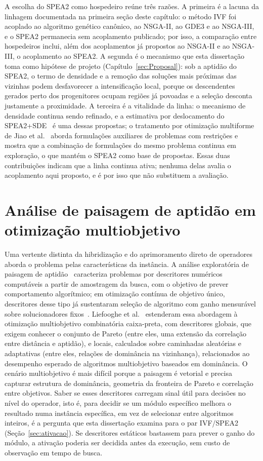 A escolha do SPEA2 como hospedeiro reúne três razões. A primeira é a lacuna da linhagem documentada na primeira seção deste capítulo: o método IVF foi acoplado ao algoritmo genético canônico, ao NSGA-II, ao GDE3 e ao NSGA-III, e o SPEA2 permanecia sem acoplamento publicado; por isso, a comparação entre hospedeiros inclui, além dos acoplamentos já propostos ao NSGA-II e ao NSGA-III, o acoplamento ao SPEA2. A segunda é o mecanismo que esta dissertação toma como hipótese de projeto (Capítulo~\ref{sec:Proposal}): sob a aptidão do SPEA2, o termo de densidade e a remoção das soluções mais próximas das vizinhas podem desfavorecer a intensificação local, porque os descendentes gerados perto dos progenitores ocupam regiões já povoadas e a seleção desconta justamente a proximidade. A terceira é a vitalidade da linha: o mecanismo de densidade continua sendo refinado, e a estimativa por deslocamento do SPEA2+SDE~\cite{li2014shift} é uma dessas propostas; o tratamento por otimização multiforme de Jiao et al.~\cite{jiao2023multiform} aborda formulações auxiliares de problemas com restrições e mostra que a combinação de formulações do mesmo problema continua em exploração, o que mantém o SPEA2 como base de propostas. Essas duas contribuições indicam que a linha continua ativa; nenhuma delas avalia o acoplamento aqui proposto, e é por isso que não substituem a avaliação.

\section{Análise de paisagem de aptidão em otimização multiobjetivo}
\label{sec:rw_paisagem}

Uma vertente distinta da hibridização e do aprimoramento direto de operadores aborda o problema pelas características da instância. A análise exploratória de paisagem de aptidão~\cite{mersmann2011exploratory} caracteriza problemas por descritores numéricos computáveis a partir de amostragem da busca, com o objetivo de prever comportamento algorítmico; em otimização contínua de objetivo único, descritores desse tipo já sustentaram seleção de algoritmo com ganho mensurável sobre solucionadores fixos~\cite{kerschke2019automated}. Liefooghe et al.~\cite{liefooghe2018landscape} estenderam essa abordagem à otimização multiobjetivo combinatória caixa-preta, com descritores globais, que exigem conhecer o conjunto de Pareto (entre eles, uma extensão da correlação entre distância e aptidão), e locais, calculados sobre caminhadas aleatórias e adaptativas (entre eles, relações de dominância na vizinhança), relacionados ao desempenho esperado de algoritmos multiobjetivo baseados em dominância. O cenário multiobjetivo é mais difícil porque a paisagem é vetorial e precisa capturar estrutura de dominância, geometria da fronteira de Pareto e correlação entre objetivos. Saber se esses descritores carregam sinal útil para decisões no nível do operador, isto é, para decidir se um módulo específico melhora o resultado numa instância específica, em vez de selecionar entre algoritmos inteiros, é a pergunta que esta dissertação examina para o par IVF/SPEA2 (Seção~\ref{sec:ativacao}). Se descritores estáticos bastassem para prever o ganho do módulo, a ativação poderia ser decidida antes da execução, sem custo de observação em tempo de busca.

